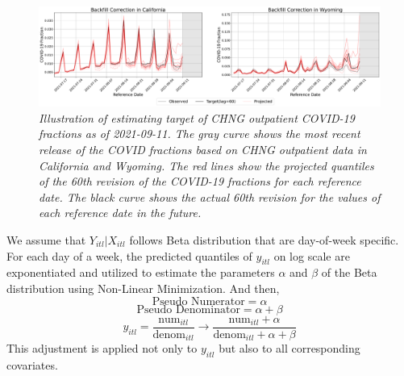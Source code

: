 \begin{figure}
    \centering
    \includegraphics[width=\textwidth]{figs/fraction_pred_example_ca&wy.pdf}
    \caption{\textit{Illustration of estimating target of CHNG outpatient COVID-19 fractions as of 2021-09-11. The gray curve shows the most recent release of the COVID fractions based on CHNG outpatient data in California and Wyoming. The red lines show the projected quantiles of the 60th revision of the COVID-19 fractions for each reference date. The black curve shows the actual 60th revision for the values of each reference date in the future.
}}
\end{figure}

We assume that $Y_{itl}|X_{itl}$ follows Beta distribution that are day-of-week specific. For each day of a week, the predicted quantiles of $y_{itl}$ on log scale are exponentiated and utilized to estimate the parameters $\alpha$ and $\beta$ of the Beta distribution using Non-Linear Minimization\cite{Dennis1983}\cite{Schnabel1985}. And then,  
$$\mbox{Pseudo Numerator} = \alpha$$
$$\mbox{Pseudo Denominator} = \alpha + \beta$$
$$y_{itl} = \frac{\mbox{num}_{itl}}{\mbox{denom}_{itl}} \rightarrow \frac{\mbox{num}_{itl} + \alpha}{\mbox{denom}_{itl} + \alpha + \beta}$$
This adjustment is applied not only to $y_{itl}$ but also to all corresponding covariates. 

